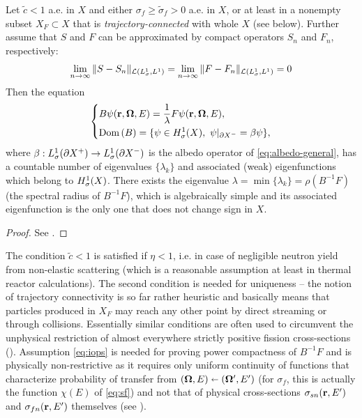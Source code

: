 \begin{theorem}\label{thm:eigenvalue}
	Let $\tilde{c} < 1$ a.e. in $X$ and either $\sigma_f \geq \tilde{\sigma}_f > 0$ a.e. in $X$, or at least in a nonempty
	subset $X_F \subset X$ that is \textit{trajectory-connected} with whole $X$ (see below). 
	Further assume that $S$ and $F$ can be approximated by compact operators $S_n$ and $F_n$, respectively:
\begin{equation}\label{eq:iops}
	\lim_{n\to\infty}\Vert S-S_n\Vert_{\mathcal{L}(\Lp[1]_{\sigma},\Lp[1])} = 
	\lim_{n\to\infty}\Vert F-F_n\Vert_{\mathcal{L}(\Lp[1]_{\sigma},\Lp[1])} = 0
\end{equation}
Then the equation
\begin{equation*}
\left\{
  \begin{aligned}
     &B\psi(\br,\bomega,E) = \frac{1}{\lambda} F\psi(\br,\bomega,E),\\
     &\Dom{B} = \{\psi\in \Hp[1]_{\sigma}(X),\ \psi\vert_{\pX[-]} = \beta\psi\},
  \end{aligned}
\right.
\end{equation*}
where $\beta : \Lp[1]_{\sigma}(\pX[+]) \to \Lp[1]_{\sigma}(\pX[-])$ is the albedo operator of
\eqref{eq:albedo-general}, has a countable number of eigenvalues $\{\lambda_k\}$ and associated (weak) eigenfunctions
which belong to $\Hp[1]_{\sigma}(X)$.
There exists the eigenvalue $\lambda = \min \{\lambda_k\} = \rho(B^{-1}F)$ (the spectral radius of $B^{-1}F$), which is
algebraically simple and its associated eigenfunction is the only one that does not change sign in $X$.
\end{theorem}
\begin{proof}
See \cite{Sanchez3}.
\end{proof}
The condition $\tilde{c} < 1$ is satisfied if $\eta < 1$, i.e. in case of negligible neutron yield from non-elastic 
scattering (which is a reasonable assumption at least in thermal reactor calculations). The second condition is needed 
for uniqueness -- the notion of trajectory connectivity is so far rather heuristic and basically means that particles 
produced in $X_F$ may reach any other point by direct streaming or through collisions. Essentially similar conditions 
are often used to circumvent the unphysical restriction of almost everywhere strictly positive fission cross-sections 
(\cite{MokhtarKharroubi,AllaireHomogenization}). Assumption \eqref{eq:iops} is needed for proving power compactness of
$B^{-1}F$ and is physically non-restrictive as it requires only uniform continuity of functions that
characterize probability of transfer from $(\bomega, E) \sla (\bomega',E')$ (for $\sigma_f$, this is actually the
function $\chi(E)$ of \eqref{eq:sf}) and not that of physical cross-sections $\sigma_{sn}(\br,E')$ and
$\sigma_{fn}(\br,E')$ themselves (see \cite{Sanchez3}).

